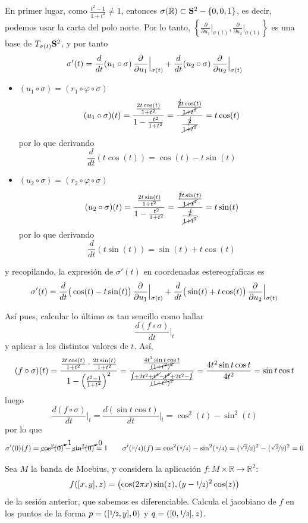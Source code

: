 \begin{sol}
En primer lugar, como $\frac{t^2-1}{1+t^2} \neq 1$, entonces $\sigma(\mathbb R)\subset \bold S^2- \{0,0,1\}$, es decir, podemos usar la carta del polo norte. Por lo tanto, $\left\{\frac{\partial}{\partial u_1}\big|_{\sigma(t)}, \frac{\partial}{\partial u_2}\big|_{\sigma(t)}\right\}$ es una base de $T_{\sigma(t)}\bold S^2$, y por tanto
$$\sigma'(t)=\dfrac{d}{dt} (u_1\circ \sigma) \, \dfrac{\partial^{} }{\partial u_1}\Big|_{\sigma(t)}+ \dfrac{d}{dt} (u_2\circ \sigma) \, \dfrac{\partial^{} }{\partial u_2}\Big|_{\sigma(t)}$$
\begin{itemize}
    \item $(u_1\circ \sigma) = (r_1 \circ \varphi \circ \sigma )$
    $$(u_1 \circ \sigma)(t) = \dfrac{\frac{2t \cos(t)}{1+t^2}}{1-\frac{t^2}{1+t^2}} = \dfrac{\frac{\cancel{2} t \cos(t)}{\cancel{1+t^2}}}{\frac{\cancel{2}}{\cancel{1+t^2}}} = t \cos(t)$$
    por lo que derivando
    $$\dfrac{d}{dt}(t \cos(t)) = \cos(t) - t \sin (t)$$
    \item  $(u_2\circ \sigma) = (r_2 \circ \varphi \circ \sigma )$
    $$(u_2 \circ \sigma)(t) = \dfrac{\frac{2t \sin(t)}{1+t^2}}{1-\frac{t^2}{1+t^2}} = \dfrac{\frac{\cancel{2} t \sin(t)}{\cancel{1+t^2}}}{\frac{\cancel{2}}{\cancel{1+t^2}}} = t \sin(t)$$
    por lo que derivando
    $$\dfrac{d}{dt}(t \sin(t)) = \sin(t) + t \cos (t)$$
\end{itemize}
y recopilando, la expresi\'on de $\sigma'(t)$ en coordenadas estereog\'raficas es 
$$\sigma'(t)=\dfrac{d}{dt} \big(\cos(t) - t \sin (t)\big) \, \dfrac{\partial^{} }{\partial u_1}\Big|_{\sigma(t)}+ \dfrac{d}{dt} \big(  \sin(t) + t \cos (t) \big) \, \dfrac{\partial^{} }{\partial u_2}\Big|_{\sigma(t)}$$

As\'i pues, calcular lo \'ultimo es tan sencillo como hallar 
$$\dfrac{d(f\circ \sigma)}{dt} \Big|_t $$
y aplicar a los distintos valores de $t$. As\'i, 
$$(f \circ \sigma)(t) = \dfrac{\frac{2t \cos(t)}{1 + t^2} \cdot\frac{2t \sin(t)}{ 1 + t^2}}{1-\left(\frac{t^2-1}{1+t^2}\right)^2}=\dfrac{\frac{4t^2 \sin t \cos t}{\cancel{(1+t^2)^2}}}{\frac{\cancel{1}+2t^2+\cancel{t^4} - \cancel{t^4} + 2t^2 - \cancel{1}}{\cancel{(1+t^2)^2}}} = \dfrac{4t^2 \sin t \cos t}{4t^2} =  \sin t \cos t$$
luego
$$\dfrac{d(f\circ \sigma)}{dt} \Big|_t = \dfrac{d(\sin t \cos t)}{dt} \Big|_t = \cos^2(t) - \sin^2(t) $$
por lo que
$$\sigma'(0)(f) = \cancelto{1}{\cos^2(0)} - \cancelto{0}{\sin^2(0)} = 1 \qquad \sigma'(\nicefrac{\pi}{4})(f) = \cos^2(\nicefrac{\pi}{4}) - \sin^2(\nicefrac{\pi}{4}) = (\nicefrac{\sqrt{2}}{2})^2 - (\nicefrac{\sqrt{2}}{2})^2  =0$$
\end{sol}
\begin{ejer}
    [2] Sea $M$ la banda de Moebius, y considera la aplicaci\'on $f : M \times \mathbb R \longrightarrow \mathbb R^2$:
    $$f([x,y],z)=\left( \cos(2\pi x) \sin(z), (y-\nicefrac{1}{2})^2 \cos(z)\right)$$
    de la sesi\'on anterior, que sabemos es diferenciable. Calcula el jacobiano de $f$ en los puntos de la forma $p = ([\nicefrac{1}{2},y],0)$ y $q=([0,\nicefrac{1}{3}],z)$.
\end{ejer}
